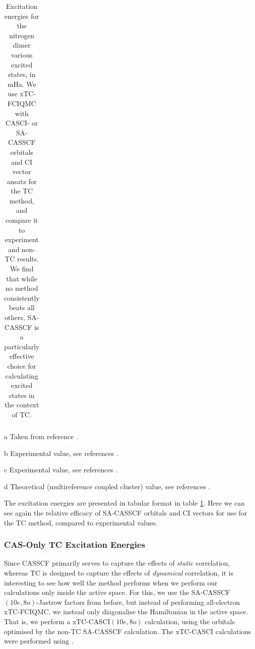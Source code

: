 \begin{table}[htbp]
\begin{threeparttable}
\begin{tabular}{c|cccc||c}
\end{tabular}
\begin{tablenotes}
    \item[a] Taken from reference .
    \item[b] Experimental value, see references \parencite{loosMountaineering2018,oddershedeComparison1985,huberConstants1979} .
    \item[c] Experimental value, see references \parencite{loosMountaineering2018,nielsenTransition1980,huberConstants1979}.
    \item[d] Theoretical (multireference coupled cluster) value, see references \parencite{loosMountaineering2018,ben-shlomoN21990}.
\end{tablenotes}
\end{threeparttable}
\caption{
    Excitation energies for the nitrogen dimer various excited states, in mHa. We use xTC-FCIQMC with CASCI- or SA-CASSCF orbitals and CI vector ansatz for the TC method, and compare it to experiment and non-TC results. We find that while no method consistently beats all others, SA-CASSCF is a particularly effective choice for calculating excited states in the context of TC.
    }
\label{tbl:excitation-energies-n2}
\end{table}

The excitation energies are presented in tabular format in table \ref{tbl:excitation-energies-n2}. Here we can see again the relative efficacy of SA-CASSCF orbitals and CI vectors for use for the TC method, compared to experimental values.

\subsubsection{CAS-Only TC Excitation Energies}

Since CASSCF primarily serves to capture the effects of \emph{static} correlation, whereas TC is designed to capture the effects of \emph{dynamical} correlation, it is interesting to see how well the method performs when we perform our calculations only inside the active space. For this, we use the SA-CASSCF$(10e,8o)$-Jastrow factors from before, but instead of performing all-electron xTC-FCIQMC, we instead only diagonalise the Hamiltonian in the active space. That is, we perform a xTC-CASCI$(10e,8o)$ calculation, using the orbitals optimised by the non-TC SA-CASSCF calculation. The xTC-CASCI calculations were performed using \neci.\supercite{gutherNECI2020}


